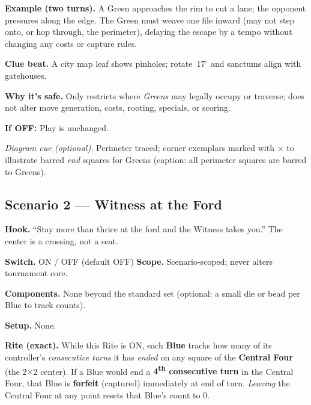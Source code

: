 \documentclass[11pt]{article}
\begin{document}
\medskip
\noindent\textbf{Example (two turns).}  
A Green approaches the rim to cut a lane; the opponent pressures along the edge. The Green must weave one file inward (may not step onto, or hop through, the perimeter), delaying the escape by a tempo without changing any costs or capture rules.

\medskip
\noindent\textbf{Clue beat.} A city map leaf shows pinholes; rotate \(\,17^\circ\) and sanctums align with gatehouses.

\medskip
\noindent\textbf{Why it’s safe.} Only restricts where \emph{Greens} may legally occupy or traverse; does not alter move generation, costs, rooting, specials, or scoring.

\medskip
\noindent\textbf{If \textsc{OFF}:} Play is unchanged.

\medskip
\noindent\textit{Diagram cue (optional).} Perimeter traced; corner exemplars marked with \(\times\) to illustrate barred \emph{end} squares for Greens (caption: all perimeter squares are barred to Greens).

\subsection{Scenario 2 — Witness at the Ford}
\label{scen:witness-ford}

\noindent\textbf{Hook.} “Stay more than thrice at the ford and the Witness takes you.” The center is a crossing, not a seat.

\medskip
\noindent\textbf{Switch.} \textsc{ON / OFF} (default \textsc{OFF}) \hfill \textbf{Scope.} Scenario-scoped; never alters tournament core.

\medskip
\noindent\textbf{Components.} None beyond the standard set (optional: a small die or bead per Blue to track counts).

\medskip
\noindent\textbf{Setup.} None.

\medskip
\noindent\textbf{Rite (exact).} While this Rite is \textsc{ON}, each \textbf{Blue} tracks how many of its controller’s \emph{consecutive turns} it has \emph{ended} on any square of the \textbf{Central Four} (the 2\(\times\)2 center). If a Blue would end a \textbf{4\textsuperscript{th} consecutive turn} in the Central Four, that Blue is \textbf{forfeit} (captured) immediately at end of turn. \emph{Leaving} the Central Four at any point resets that Blue’s count to 0.
\end{document}
